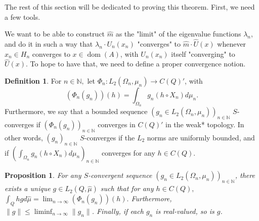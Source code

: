 \documentclass{amsart}
\newtheorem{prop}[thm]{Proposition}
\theoremstyle{definition}
\newtheorem{definition}[thm]{Definition}
\theoremstyle{remark}
\def \Dom{\operatorname{dom}}
\def \HMU{\hat{\mu}}
\def \HU{\hat{U}}
\def \Hm{\hat{m}}
\begin{document}
The rest of this section will be dedicated to proving this theorem. First, we need a few tools. 



We want to be able to construct $\Hm$ as the "limit" of the eigenvalue functions $\lambda_n$, and do it in such a way that $\lambda_n\cdot U_n(x_n)$ "converges" to $\Hm\cdot\HU(x)$ whenever $x_n\in H_n$ converges to $x\in\Dom(A)$, with $U_n(x_n)$ itself "converging" to $\HU(x).$ To hope to have that, we need to define a proper convergence notion. 


\begin{definition}\label{definition_L2_limit}
	For $n\in\mathbb{N},$ let $\Phi_n:L_2(\Omega_n,\mu_n)\rightarrow C(Q)'$, with $$(\Phi_n(g_n))(h)=\int_{\Omega_n} g_n(h\circ X_n)d\mu_n.$$ Furthermore, we say that a bounded sequence $(g_n\in L_2(\Omega_n,\mu_n))_{n\in\mathbb{N}}$ $S$-converges if $(\Phi_n(g_n))_{n\in\mathbb{N}}$ converges in $C(Q)'$ in the weak* topology. In other words,  $(g_n)_{n\in\mathbb{N}}$ $S$-converges if the $L_2$ norms are uniformly bounded, and if $\left(\int_{\Omega_n}g_n(h\circ X_n)d\mu_n\right)_{n\in\mathbb{N}}$ converges for any $h\in C(Q).$
\end{definition}
\begin{prop}\label{proposition_L2_limit}
	For any $S$-convergent sequence $(g_n\in L_2(\Omega_n,\mu_n))_{n\in\mathbb{N}}$, there exists a unique $g\in L_2(Q,\HMU)$ such that for any $h\in C(Q),$ $\int_{Q}hgd\HMU=\lim_{n\rightarrow\infty}(\Phi_n(g_n))(h).$ Furthermore, $\|g\|\leq\liminf_{n\rightarrow\infty}\|g_n\|$. Finally, if each $g_n$ is real-valued, so is $g$.
\end{prop}
\end{document}
